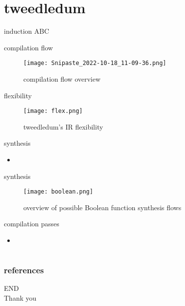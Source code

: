 \documentclass[aspectratio=1610]{beamer}
\begin{document}
\section{tweedledum}
\begin{frame}{induction}  
  ABC 
\end{frame}
\begin{frame}{compilation flow}
  \begin{figure}[htbq]
    \centering
    \texttt{[image: Snipaste\_2022-10-18\_11-09-36.png]}
    \caption{compilation flow overview} 
    \label{fig-compilation}
  \end{figure}
\end{frame}
\begin{frame}{flexibility}
  \begin{figure}[htbq]
    \centering
    \texttt{[image: flex.png]}
    \caption{tweedledum's IR flexibility} 
    \label{fig-flex}
  \end{figure}
\end{frame}
\begin{frame}{synthesis}
  \begin{itemize}
    \item 
  \end{itemize}  
\end{frame}
\begin{frame}{synthesis}
  \begin{figure}[htbq]
    \centering
    \texttt{[image: boolean.png]}
    \caption{overview of possible Boolean function synthesis flows} 
    \label{fig-boolean}
  \end{figure}
\end{frame}
\begin{frame}{compilation passes}
  \begin{itemize}
    \item 
  \end{itemize}
\end{frame}
\section*{}
\begin{frame}
	\frametitle{references}
	\printbibliography
\end{frame}
\begin{frame}
\centering
\Huge{END\\Thank you}
\end{frame}
\end{document}
